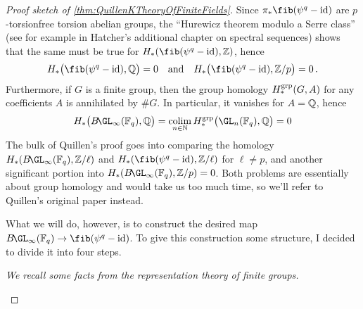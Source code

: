 \begin{proof}[Proof sketch of \cref{thm:QuillenKTheoryOfFiniteFields}]
	Since $\pi_*\fib(\psi^q-\id)$ are $p$-torsionfree torsion abelian groups, the \enquote{Hurewicz theorem modulo a Serre class} (see for example \cite[Theorem~\href{https://pi.math.cornell.edu/~hatcher/AT/ATch5.pdf}{5.7}]{Hatcher} in Hatcher's additional chapter on spectral sequences) shows that the same must be true for $H_*(\fib(\psi^q-\id),\IZ)$, hence
	\begin{equation*}
		H_*\big(\fib(\psi^q-\id),\IQ\big)=0\quad\text{and}\quad H_*\big(\fib(\psi^q-\id),\IZ/p\big)=0\,.
	\end{equation*}
	Furthermore, if $G$ is a finite group, then the group homology $H_*^{\mathrm{grp}}(G,A)$ for any coefficients $A$ is annihilated by $\# G$. In particular, it vanishes for $A=\mathbb{Q}$, hence
	\begin{equation*}
		H_*\big(B\!\GL_\infty(\IF_q),\IQ\big)=\colimit_{n\in\IN}H_*^{\grp}\big(\GL_n(\IF_q),\IQ\big)=0
	\end{equation*}
	The bulk of Quillen's proof goes into comparing the homology $H_*(B\!\GL_\infty(\IF_q),\IZ/\ell)$ and $H_*(\fib(\psi^q-\id),\IZ/\ell)$ for $\ell\neq p$, and another significant portion into $H_*(B\!\GL_\infty(\IF_q),\IZ/p)=0$. Both problems are essentially about group homology and would take us too much time, so we'll refer to Quillen's original paper \cite{QuillenKTheoryOfFiniteFields} instead.
	
	What we will do, however, is to construct the desired map $B\!\GL_\infty(\IF_q)\morphism \fib(\psi^q-\id)$. To give this construction some structure, I decided to divide it into four steps.
	\begin{alphanumerate}
		\item[\itememph{0}] \itshape We recall some facts from the representation theory of finite groups.
	\end{alphanumerate}
	

\end{proof}
